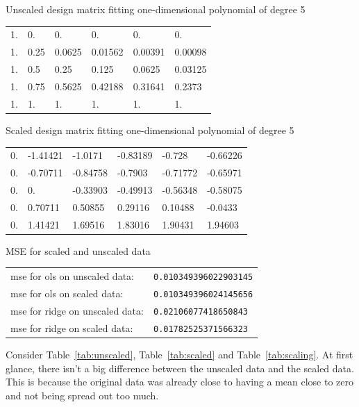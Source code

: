 \documentclass[twoside,11pt]{report}
\begin{document}
\begin{mytable}[float=!h, label=tab:unscaled]{Unscaled design matrix fitting one-dimensional polynomial of degree 5}
\tt
\centering
\begin{tabular}{llllll}
    1. &     0.  &    0.  &    0.   &   0.   &   0.     \\
    1. &     0.25 &   0.0625 & 0.01562& 0.00391& 0.00098\\
    1.    &  0.5     &0.25 &   0.125 &  0.0625 & 0.03125\\
    1.   &   0.75  &  0.5625 & 0.42188 &0.31641& 0.2373 \\
    1.  &    1.   &   1.  &    1.  &    1.    &  1.
\end{tabular}%
\end{mytable}
\begin{mytable}[float=!h,label=tab:scaled]{Scaled design matrix fitting one-dimensional polynomial of degree 5}
\tt
\centering
\begin{tabular}{llllll}
     0. &     -1.41421& -1.0171&  -0.83189& -0.728 &  -0.66226\\
     0.  &    -0.70711& -0.84758& -0.7903 & -0.71772& -0.65971\\
     0.  &     0.    &  -0.33903& -0.49913& -0.56348& -0.58075\\
     0.  &     0.70711&  0.50855&  0.29116 & 0.10488& -0.0433 \\
     0.  &     1.41421&  1.69516 & 1.83016 & 1.90431&  1.94603
\end{tabular}%
\end{mytable}
\begin{mytable}[float=!h,label=tab:scaling]{MSE for scaled and unscaled data}
\centering
\begin{tabular}{ll}
mse for ols on unscaled data:    &   \texttt{0.010349396022903145} \\
mse for ols on scaled data:      &   \texttt{0.010349396024145656} \\
mse for ridge on unscaled data:  &   \texttt{0.02106077418650843} \\
mse for ridge on scaled data:    &   \texttt{0.01782525371566323}
\end{tabular}%
\end{mytable}
Consider Table~\ref{tab:unscaled}, Table~\ref{tab:scaled} and Table~\ref{tab:scaling}. At first glance, 
there isn't a big difference between the unscaled data and the scaled data. 
This is because the original data was already close to having a mean close to zero and not being spread out too much. 
\end{document}
